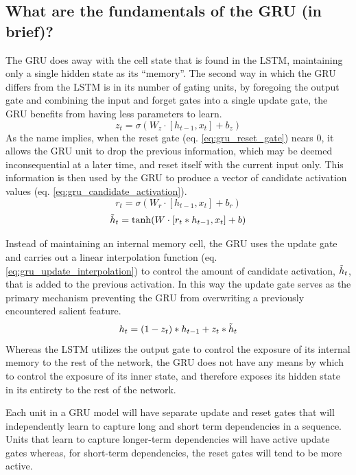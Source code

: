 \documentclass[12pt, a4paper]{report}
\theoremstyle{definition}
\theoremstyle{definition}%
\theoremstyle{definition}%
\theoremstyle{definition}%
\theoremstyle{definition}%
\theoremstyle{definition}%
\begin{document}
\subsection{What are the fundamentals of the GRU (in brief)?}
The GRU does away with the cell state that is found in the LSTM, maintaining only a single hidden state as its \enquote{memory}. The second way in which the GRU differs from the LSTM is in its number of gating units, by foregoing the output gate and combining the input and forget gates into a single update gate, the GRU benefits from having less parameters to learn.
\begin{equation} \label{eq:gru_update_gate}
	z_t = \sigma(W_z\cdot[h_{t-1},x_t] + b_z)
\end{equation}
As the name implies, when the reset gate (eq. \ref{eq:gru_reset_gate}) nears $0$, it allows the GRU unit to drop the previous information, which may be deemed inconsequential at a later time, and reset itself with the current input only. This information is then used by the GRU to produce a vector of candidate activation values (eq. \ref{eq:gru_candidate_activation}).
\begin{equation} \label{eq:gru_reset_gate}
	r_t = \sigma(W_r\cdot[h_{t-1},x_t] + b_r)
\end{equation}
\begin{equation} \label{eq:gru_candidate_activation}
	\Tilde{h}_t = \tanh(W\cdot[r_t * h_{t-1},x_t] + b)
\end{equation}

Instead of maintaining an internal memory cell, the GRU uses the update gate and carries out a linear interpolation function (eq. \ref{eq:gru_update_interpolation}) to control the amount of candidate activation, $\Tilde{h}_t$, that is added to the previous activation. In this way the update gate serves as the primary mechanism preventing the GRU from overwriting a previously encountered salient feature.
\begin{equation} \label{eq:gru_update_interpolation}
	h_t = (1-z_t)*h_{t-1} + z_t*\Tilde{h}_t
\end{equation}
Whereas the LSTM utilizes the output gate to control the exposure of its internal memory to the rest of the network, the GRU does not have any means by which to control the exposure of its inner state, and therefore exposes its hidden state in its entirety to the rest of the network.

Each unit in a GRU model will have separate update and reset gates that will independently learn to capture long and short term dependencies in a sequence. Units that learn to capture longer-term dependencies will have active update gates whereas, for short-term dependencies, the reset gates will tend to be more active.
\end{document}

